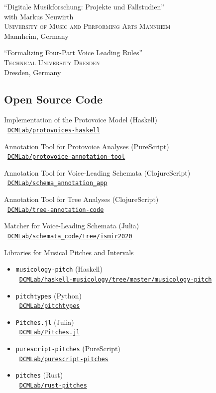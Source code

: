 \documentclass[10pt]{scrartcl}
\newcommand{\margintext}[1]{\marginpar{\raggedleft\itshape\small#1}}
\newcommand{\entry}[1]{\vphantom{x}\margintext{#1}}
\begin{document}
\invited \enquote{Digitale Musikforschung: Projekte und Fallstudien}
\\
with Markus Neuwirth\\
\textsc{University of Music and Performing Arts Mannheim}\\
Mannheim, Germany

\entry{2017}%
\invited \enquote{Formalizing Four-Part Voice Leading Rules}
\\
\textsc{Technical University Dresden}\\
Dresden, Germany

\subsection*{Open Source Code}

\newcommand{\codelink}[1]{\faCodeFork\ \href{https://#1}{\nolinkurl{#1}}}
\newcommand{\ghlink}[1]{\faGithub\ \href{https://github.com/#1}{\nolinkurl{#1}}}

Implementation of the Protovoice Model (Haskell)\\
\ghlink{DCMLab/protovoices-haskell}

Annotation Tool for Protovoice Analyses (PureScript)\\
\ghlink{DCMLab/protovoice-annotation-tool}

Annotation Tool for Voice-Leading Schemata (ClojureScript)\\
\ghlink{DCMLab/schema_annotation_app}

Annotation Tool for Tree Analyses (ClojureScript)\\
\ghlink{DCMLab/tree-annotation-code}

Matcher for Voice-Leading Schemata (Julia)\\
\ghlink{DCMLab/schemata_code/tree/ismir2020}

Libraries for Musical Pitches and Intervals
\begin{itemize}
\item \texttt{musicology-pitch} (Haskell)\\
  \ghlink{DCMLab/haskell-musicology/tree/master/musicology-pitch}
\item \texttt{pitchtypes} (Python)\\
  \ghlink{DCMLab/pitchtypes}
\item \texttt{Pitches.jl} (Julia)\\
  \ghlink{DCMLab/Pitches.jl}
\item \texttt{purescript-pitches} (PureScript)\\
  \ghlink{DCMLab/purescript-pitches}
\item \texttt{pitches} (Rust)\\
  \ghlink{DCMLab/rust-pitches}
\end{itemize}
\end{document}

